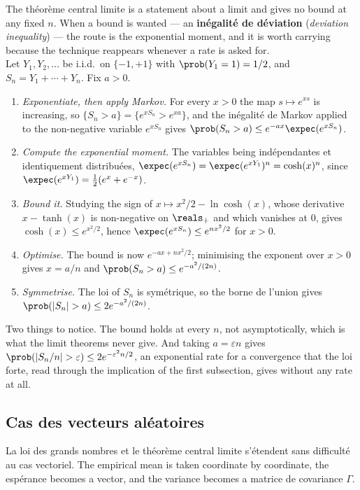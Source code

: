\begin{example}
  The théorème central limite is a statement about a limit and gives no bound at
  any fixed $n$. When a bound is wanted --- an \textbf{inégalité de déviation}
  (\textit{deviation inequality}) --- the route is the exponential moment, and
  it is worth carrying because the technique reappears whenever a rate is asked
  for.\\
  Let $Y_{1}, Y_{2}, \dots$ be i.i.d.\ on $\{-1,+1\}$ with
  $\prob(Y_{1} = 1) = 1/2$, and $S_{n} = Y_{1} + \cdots + Y_{n}$. Fix $a > 0$.
  \begin{enumerate}
    \item \emph{Exponentiate, then apply Markov.} For every $x > 0$ the map
      $s \mapsto e^{xs}$ is increasing, so $\{S_{n} > a\} = \{e^{xS_{n}} >
      e^{xa}\}$, and the inégalité de Markov applied to the non-negative
      variable $e^{xS_{n}}$ gives $\prob(S_{n} > a) \leq e^{-ax}\expec(e^{xS_{n}})$.
    \item \emph{Compute the exponential moment.} The variables being
      indépendantes et identiquement distribuées,
      $\expec(e^{xS_{n}}) = \expec(e^{xY_{1}})^{n} = \cosh(x)^{n}$, since
      $\expec(e^{xY_{1}}) = \frac{1}{2}(e^{x} + e^{-x})$.
    \item \emph{Bound it.} Studying the sign of $x \mapsto x^{2}/2 -
      \ln\cosh(x)$, whose derivative $x - \tanh(x)$ is non-negative on
      $\reals_{+}$ and which vanishes at $0$, gives $\cosh(x) \leq e^{x^{2}/2}$,
      hence $\expec(e^{xS_{n}}) \leq e^{nx^{2}/2}$ for $x > 0$.
    \item \emph{Optimise.} The bound is now $e^{-ax + nx^{2}/2}$; minimising the
      exponent over $x > 0$ gives $x = a/n$ and
      $\prob(S_{n} > a) \leq e^{-a^{2}/(2n)}$.
    \item \emph{Symmetrise.} The loi of $S_{n}$ is symétrique, so the borne de
      l'union gives $\prob(|S_{n}| > a) \leq 2e^{-a^{2}/(2n)}$.
  \end{enumerate}
  Two things to notice. The bound holds at every $n$, not asymptotically, which
  is what the limit theorems never give. And taking $a = \varepsilon n$ gives
  $\prob(|S_{n}/n| > \varepsilon) \leq 2e^{-\varepsilon^{2}n/2}$, an exponential
  rate for a convergence that the loi forte, read through the implication of
  the first subsection, gives without any rate at all.
\end{example}

\subsection{Cas des vecteurs aléatoires}
La loi des grands nombres et le théorème central limite s'étendent sans
difficulté au cas vectoriel. The empirical mean is taken coordinate by
coordinate, the espérance becomes a vector, and the variance becomes a matrice
de covariance $\Gamma$.

